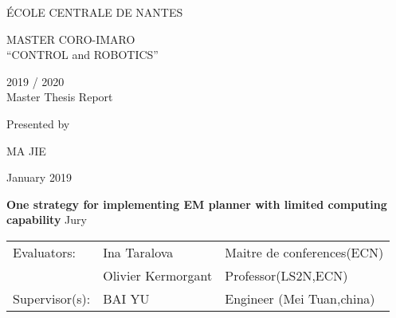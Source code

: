 
\thispagestyle{empty}

\def\lskip{\vspace{0.5cm}}

\begin{center}
ÉCOLE CENTRALE DE NANTES
\end{center}

\vspace{2cm}

\begin{center} \large\sc MASTER CORO-IMARO\\ \normalsize{``CONTROL and ROBOTICS''} 
\end{center}

\begin{center}
	2019 / 2020\\
	\lskip
	Master Thesis Report
	\lskip
	
	Presented by \lskip 
	
	MA JIE \lskip
	
	January 2019 \lskip\lskip
	
	{\Large \textbf{One strategy for implementing EM planner with limited computing capability}}
	\vfill
Jury \lskip
		
	\end{center}
	


\begin{tabular}{p{3cm}p{7cm}p{5cm} }
 Evaluators: & Ina Taralova & Maitre de conferences(ECN) \\
	      & Olivier Kermorgant & Professor(LS2N,ECN) \\ 
  Supervisor(s):  & BAI YU & Engineer (Mei Tuan,china) \\		  
\end{tabular}

\lskip

\newpage
\addtocounter{page}{-1}
\pagestyle{fancy}
